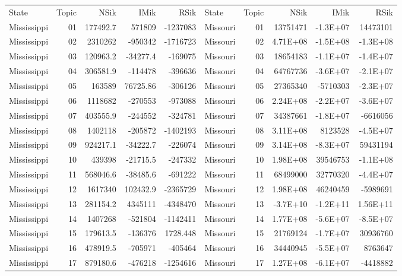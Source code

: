 \begin{table}[]
	\footnotesize
	\begin{tabular}{lrrrrlrrrr}
	State & Topic & NSik & IMik & RSik & State & Topic & NSik & IMik & RSik \\
		Mississippi &  01  & 177492.7 & 571809 & -1237083 & Missouri &  01  & 13751471 & -1.3E+07 & 14473101 \\
		Mississippi &  02  & 2310262 & -950342 & -1716723 & Missouri &  02  & 4.71E+08 & -1.5E+08 & -1.3E+08 \\
		Mississippi &  03  & 120963.2 & -34277.4 & -169075 & Missouri &  03  & 18654183 & -1.1E+07 & -1.4E+07 \\
		Mississippi &  04  & 306581.9 & -114478 & -396636 & Missouri &  04  & 64767736 & -3.6E+07 & -2.1E+07 \\
		Mississippi &  05  & 163589 & 76725.86 & -306126 & Missouri &  05  & 27365340 & -5710303 & -2.3E+07 \\
		Mississippi &  06  & 1118682 & -270553 & -973088 & Missouri &  06  & 2.24E+08 & -2.2E+07 & -3.6E+07 \\
		Mississippi &  07  & 403555.9 & -244552 & -324781 & Missouri &  07  & 34387661 & -1.8E+07 & -6616056 \\
		Mississippi &  08  & 1402118 & -205872 & -1402193 & Missouri &  08  & 3.11E+08 & 8123528 & -4.5E+07 \\
		Mississippi &  09  & 924217.1 & -34222.7 & -226074 & Missouri &  09  & 3.14E+08 & -8.3E+07 & 59431194 \\
		Mississippi &  10 & 439398 & -21715.5 & -247332 & Missouri &  10 & 1.98E+08 & 39546753 & -1.1E+08 \\
		Mississippi &  11 & 568046.6 & -38485.6 & -691222 & Missouri &  11 & 68499000 & 32770320 & -4.4E+07 \\
		Mississippi &  12 & 1617340 & 102432.9 & -2365729 & Missouri &  12 & 1.98E+08 & 46240459 & -5989691 \\
		Mississippi &  13 & 281154.2 & 4345111 & -4348470 & Missouri &  13 & -3.7E+10 & -1.2E+11 & 1.56E+11 \\
		Mississippi &  14 & 1407268 & -521804 & -1142411 & Missouri &  14 & 1.77E+08 & -5.6E+07 & -8.5E+07 \\
		Mississippi &  15 & 179613.5 & -136376 & 1728.448 & Missouri &  15 & 21769124 & -1.7E+07 & 30936760 \\
		Mississippi &  16 & 478919.5 & -705971 & -405464 & Missouri &  16 & 34440945 & -5.5E+07 & 8763647 \\
		Mississippi &  17 & 879180.6 & -476218 & -1254616 & Missouri &  17 & 1.27E+08 & -6.1E+07 & -4418882 \\

\end{tabular}
\end{table}
